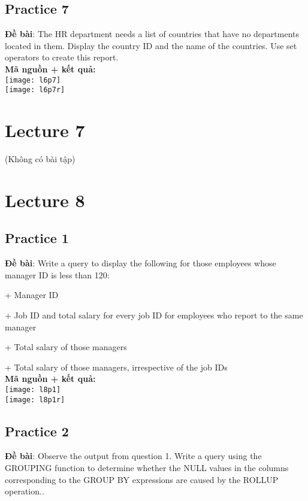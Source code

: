 \documentclass[a4paper]{report}
\begin{document}
\subsection{Practice 7}
\noindent
\textbf{Đề bài}: The HR department needs a list of countries that have no departments located in them. Display the country ID and the name of the countries. Use set operators to create this report.\\

\textbf{Mã nguồn + kết quả: }\\
\texttt{[image: l6p7]}\\
\texttt{[image: l6p7r]}

\section{Lecture 7}\par(Không có bài tập)

\section{Lecture 8}
\subsection{Practice 1}
\noindent
\textbf{Đề bài}: Write a query to display the following for those employees whose manager ID is less than 120:\par
+ Manager ID\par
+ Job ID and total salary for every job ID for employees who report to the same manager\par
+ Total salary of those managers\par
+ Total salary of those managers, irrespective of the job IDs\\

\textbf{Mã nguồn + kết quả: }\\
\texttt{[image: l8p1]}\\
\texttt{[image: l8p1r]}

\subsection{Practice 2}
\noindent
\textbf{Đề bài}: Observe the output from question 1. Write a query using the GROUPING function to determine whether the NULL values in the columns corresponding to the GROUP BY expressions are caused by the ROLLUP operation..\\
\end{document}
